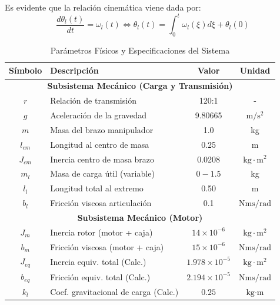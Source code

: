 \documentclass[12pt, a4paper,journal, onecolumn, compsoc]{IEEEtran}
\begin{document}
Es evidente que la relación cinemática viene dada por:
\[
    \frac{d\theta_l(t)}{dt} = \omega_l(t) \Leftrightarrow \theta_l(t) = \int_0^t{\omega_l(\xi)d\xi + \theta_l(0)}
\]

\begin{table}[htbp]
    \caption{Parámetros Físicos y Especificaciones del Sistema}
    \centering
    \renewcommand{\arraystretch}{1.2} %
    \begin{tabular}{|c|l|c|c|}
        \hline
        \textbf{Símbolo} & \textbf{Descripción} & \textbf{Valor} & \textbf{Unidad} \\
        \hline
        \multicolumn{4}{|c|}{\textbf{Subsistema Mecánico (Carga y Transmisión)}} \\
        \hline
        $r$ & Relación de transmisión & 120:1 & - \\
        $g$ & Aceleración de la gravedad & 9.80665 & $\text{m}/\text{s}^2$ \\
        $m$ & Masa del brazo manipulador & 1.0 & kg \\
        $l_{cm}$ & Longitud al centro de masa & 0.25 & m \\
        $J_{cm}$ & Inercia centro de masa brazo & 0.0208 & $\text{kg}\cdot\text{m}^2$ \\
        $m_l$ & Masa de carga útil (variable) & $0 - 1.5$ & kg \\
        $l_{l}$ & Longitud total al extremo & 0.50 & m \\
        $b_{l}$ & Fricción viscosa articulación & 0.1 & $\text{Nms}/\text{rad}$ \\
        \hline
        \multicolumn{4}{|c|}{\textbf{Subsistema Mecánico (Motor)}} \\
        \hline
        $J_m$ & Inercia rotor (motor + caja) & $14 \times 10^{-6}$ & $\text{kg}\cdot\text{m}^2$ \\
        $b_m$ & Fricción viscosa (motor + caja) & $15 \times 10^{-6}$ & $\text{Nms}/\text{rad}$ \\
        $J_{eq}$ & Inercia equiv. total (Calc.) & $1.978 \times 10^{-5}$ & $\text{kg}\cdot\text{m}^2$ \\
        $b_{eq}$ & Fricción equiv. total (Calc.) & $2.194 \times 10^{-5}$ & $\text{Nms}/\text{rad}$ \\
        $k_l$ & Coef. gravitacional de carga (Calc.) & $0.25$ & $\text{kg}\cdot\text{m}$ \\

\end{tabular}
\end{table}
\end{document}
